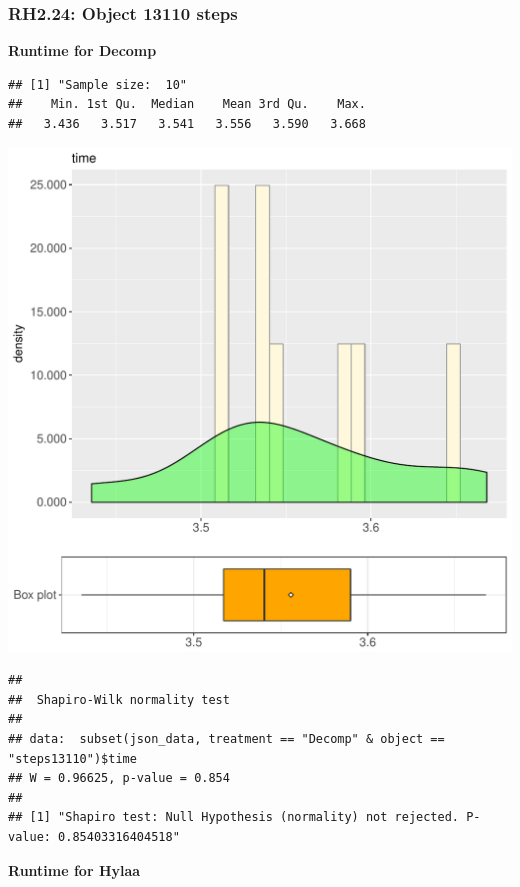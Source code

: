 \documentclass{article}\usepackage[]{graphicx}\usepackage[]{color}
\makeatletter
\def\maxwidth{ %
  \ifdim\Gin@nat@width>\linewidth
    \linewidth
  \else
    \Gin@nat@width
  \fi
}
\newenvironment{kframe}{%
 \def\at@end@of@kframe{}%
 \ifinner\ifhmode%
  \def\at@end@of@kframe{\end{minipage}}%
  \begin{minipage}{\columnwidth}%
 \fi\fi%
 \def\FrameCommand##1{\hskip\@totalleftmargin \hskip-\fboxsep
 \colorbox{shadecolor}{##1}\hskip-\fboxsep
     \hskip-\linewidth \hskip-\@totalleftmargin \hskip\columnwidth}%
 \MakeFramed {\advance\hsize-\width
   \@totalleftmargin\z@ \linewidth\hsize
   \@setminipage}}%
 {\par\unskip\endMakeFramed%
 \at@end@of@kframe}
\newenvironment{knitrout}{}{} %
\makeatother
\begin{document}
\subsubsection{RH2.24: Object 13110 steps}

 \textbf{Runtime for Decomp}
\begin{knitrout}
\color{fgcolor}\begin{kframe}
\begin{verbatim}
## [1] "Sample size:  10"
##    Min. 1st Qu.  Median    Mean 3rd Qu.    Max. 
##   3.436   3.517   3.541   3.556   3.590   3.668
\end{verbatim}
\end{kframe}
\includegraphics[width=\maxwidth]{figure/RH2_Decomp_steps13110-1} 
\begin{kframe}\begin{verbatim}
## 
## 	Shapiro-Wilk normality test
## 
## data:  subset(json_data, treatment == "Decomp" & object == "steps13110")$time
## W = 0.96625, p-value = 0.854
## 
## [1] "Shapiro test: Null Hypothesis (normality) not rejected. P-value: 0.85403316404518"
\end{verbatim}
\end{kframe}
\end{knitrout}
 \textbf{Runtime for Hylaa}
\end{document}
